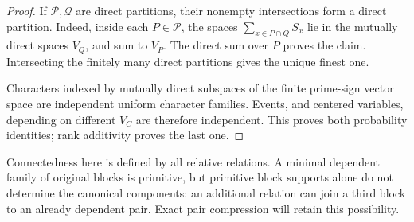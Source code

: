 \begin{proof}
If \(\mathcal P,\mathcal Q\) are direct partitions,
their nonempty intersections form a direct partition.
Indeed, inside each \(P\in\mathcal P\), the spaces
\(\sum_{x\in P\cap Q}S_x\) lie in the mutually direct
spaces \(V_Q\), and sum to \(V_P\). The direct sum over
\(P\) proves the claim. Intersecting the finitely many
direct partitions gives the unique finest one.

Characters indexed by mutually direct subspaces of
the finite prime-sign vector space are independent
uniform character families. Events, and centered
variables, depending on different \(V_C\) are therefore
independent. This proves both probability identities;
rank additivity proves the last one.
\end{proof}

Connectedness here is defined by all relative
relations. A minimal dependent family of original
blocks is primitive, but primitive block supports
alone do not determine the canonical components:
an additional relation can join a third block to
an already dependent pair. Exact pair compression
will retain this possibility.
